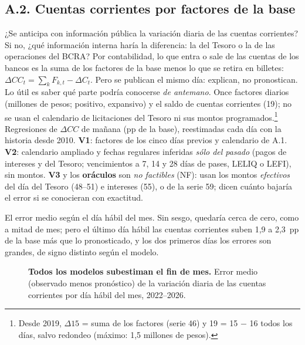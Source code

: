 \subsection*{A.2. Cuentas corrientes por factores de la base}
 ¿Se anticipa con información pública la variación diaria de las cuentas corrientes? Si no, ¿qué información interna haría la diferencia: la del Tesoro o la de las operaciones del BCRA?
 Por contabilidad, lo que entra o sale de las cuentas de los bancos es la suma de los factores de la base menos lo que se retira en billetes: $\Delta CC_t = \sum_k F_{k,t} - \Delta C_t$. Pero se publican el mismo día: explican, no pronostican. Lo útil es saber qué parte podría conocerse \emph{de antemano}.
 Once factores diarios (millones de pesos; positivo, expansivo) y el saldo de cuentas corrientes (19); no se usan el calendario de licitaciones del Tesoro ni sus montos programados.\footnote{Desde 2019, $\Delta 15$ = suma de los factores (serie 46) y 19 = 15 $-$ 16 todos los días, salvo redondeo (máximo: 1,5 millones de pesos).}  Regresiones de $\Delta CC$ de mañana (pp de la base), reestimadas cada día con la historia desde 2010. \textbf{V1}: factores de los cinco días previos y calendario de A.1. \textbf{V2}: calendario ampliado y fechas regulares inferidas \emph{sólo del pasado} (pagos de intereses y del Tesoro; vencimientos a 7, 14 y 28 días de pases, LELIQ o LEFI), sin montos. \textbf{V3} y los \textbf{oráculos} son \emph{no factibles} (NF): usan los montos \emph{efectivos} del día del Tesoro (48--51) e intereses (55), o de la serie 59; dicen cuánto bajaría el error si se conocieran con exactitud.

 El error medio según el día hábil del mes. Sin sesgo, quedaría cerca de cero, como a mitad de mes; pero el último día hábil las cuentas corrientes suben 1,9 a 2,3~pp de la base más que lo pronosticado, y los dos primeros días los errores son grandes, de signo distinto según el modelo.

\begin{figure}[H]\centering
\caption{\textbf{Todos los modelos subestiman el fin de mes.} Error medio (observado menos pronóstico) de la variación diaria de las cuentas corrientes por día hábil del mes, 2022--2026.}\label{f:perfil}
\end{figure}

